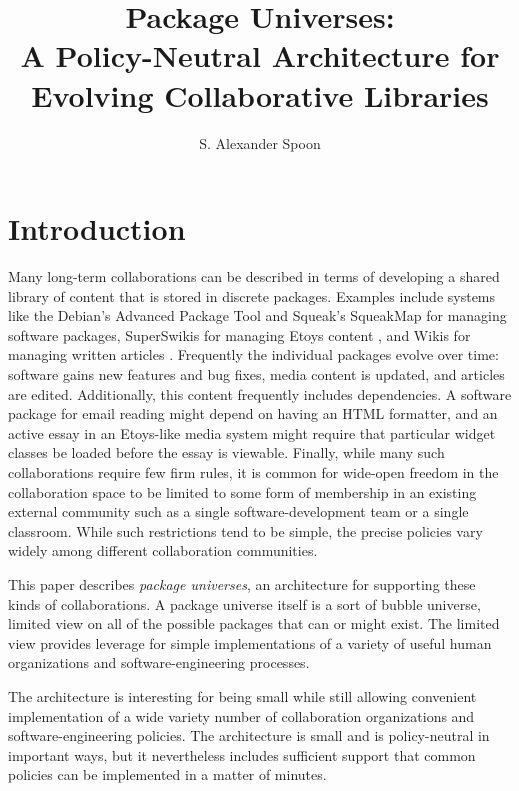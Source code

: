 \documentclass{IEEEtran}
\begin{document}


\title{Package Universes:\\
       A Policy-Neutral Architecture for\\Evolving Collaborative Libraries}
\author{S. Alexander Spoon}
\maketitle


\section{Introduction}

Many long-term collaborations can be described in terms of developing
a shared library of content that is stored in discrete packages.  
Examples include systems like the Debian's Advanced Package Tool and
Squeak's SqueakMap for managing software packages, SuperSwikis for
managing Etoys content \cite{steinmetz02:learning}, and Wikis for
managing written articles \cite{ward01:wikiway}.  Frequently the
individual packages evolve over time: software gains new
features and bug fixes, media content is updated, and articles are
edited.  Additionally, this content frequently includes dependencies.
A software package for email reading might depend on having an HTML
formatter, and an active essay in an Etoys-like media system might
require that particular widget classes be loaded before the essay is
viewable.  Finally, while many such collaborations require few firm
rules, it is common for wide-open freedom in the collaboration space
to be limited to some form of membership in an existing external
community such as a single software-development team or a single
classroom.  While such restrictions tend to be simple, the precise
policies vary widely among different collaboration communities.


This paper describes \emph{package universes}, an architecture for
supporting these kinds of collaborations.  A package universe itself
is a sort of bubble universe, limited view on all of the possible
packages that can or might exist.  The limited view provides leverage
for simple implementations of a variety of useful human organizations
and software-engineering processes.

The architecture is interesting for being small while still allowing
convenient implementation of a wide variety number of collaboration
organizations and software-engineering policies.  The architecture is
small and is policy-neutral in important ways, but it nevertheless
includes sufficient support that common policies can be implemented in
a matter of minutes.
\end{document}
